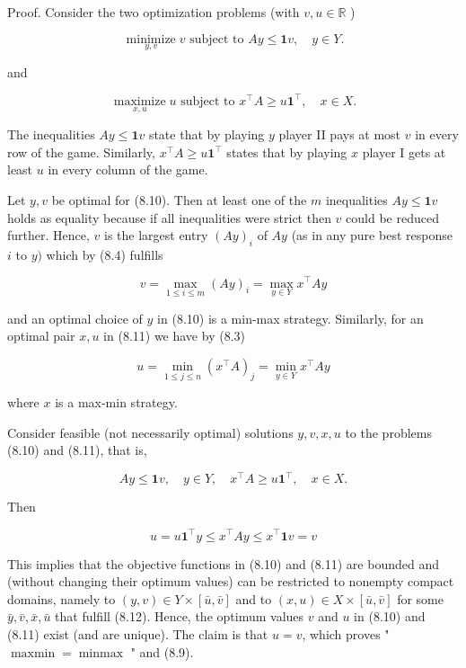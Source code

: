 \documentclass[12pt]{article}
\begin{document}
Proof. Consider the two optimization problems (with $v, u \in \mathbb{R}$ )


\begin{equation*}
\underset{y, v}{\operatorname{minimize}} v \text { subject to } A y \leq \mathbf{1} v, \quad y \in Y . \tag{8.10}
\end{equation*}


and


\begin{equation*}
\underset{x, u}{\operatorname{maximize}} u \text { subject to } x^{\top} A \geq u \mathbf{1}^{\top}, \quad x \in X . \tag{8.11}
\end{equation*}


The inequalities $A y \leq \mathbf{1} v$ state that by playing $y$ player II pays at most $v$ in every row of the game. Similarly, $x^{\top} A \geq u \mathbf{1}^{\top}$ states that by playing $x$ player I gets at least $u$ in every column of the game.

Let $y, v$ be optimal for (8.10). Then at least one of the $m$ inequalities $A y \leq \mathbf{1} v$ holds as equality because if all inequalities were strict then $v$ could be reduced further. Hence, $v$ is the largest entry $(A y)_{i}$ of $A y$ (as in any pure best response $i$ to $y)$ which by (8.4) fulfills

$$
v=\max _{1 \leq i \leq m}(A y)_{i}=\max _{y \in Y} x^{\top} A y
$$

and an optimal choice of $y$ in (8.10) is a min-max strategy. Similarly, for an optimal pair $x, u$ in (8.11) we have by (8.3)

$$
u=\min _{1 \leq j \leq n}\left(x^{\top} A\right)_{j}=\min _{y \in Y} x^{\top} A y
$$

where $x$ is a max-min strategy.

Consider feasible (not necessarily optimal) solutions $y, v, x, u$ to the problems (8.10) and (8.11), that is,


\begin{equation*}
A y \leq \mathbf{1} v, \quad y \in Y, \quad x^{\top} A \geq u \mathbf{1}^{\top}, \quad x \in X . \tag{8.12}
\end{equation*}


Then


\begin{equation*}
u=u \mathbf{1}^{\top} y \leq x^{\top} A y \leq x^{\top} \mathbf{1} v=v \tag{8.13}
\end{equation*}


This implies that the objective functions in (8.10) and (8.11) are bounded and (without changing their optimum values) can be restricted to nonempty compact domains, namely to $(y, v) \in Y \times[\bar{u}, \bar{v}]$ and to $(x, u) \in X \times[\bar{u}, \bar{v}]$ for some $\bar{y}, \bar{v}, \bar{x}, \bar{u}$ that fulfill (8.12). Hence, the optimum values $v$ and $u$ in (8.10) and (8.11) exist (and are unique). The claim is that $u=v$, which proves " $\operatorname{maxmin}=\operatorname{minmax}$ " and (8.9).
\end{document}

